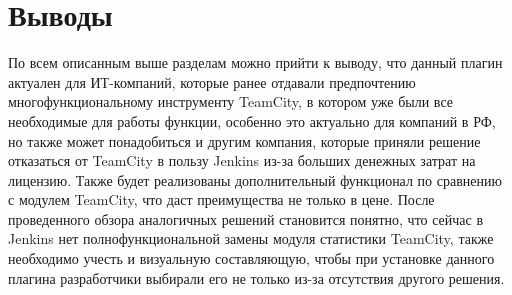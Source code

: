 \section{Выводы} \label{ch1:sec7}

По всем описанным выше разделам можно прийти к выводу, что данный плагин актуален для ИТ-компаний, которые ранее отдавали предпочтению многофункциональному инструменту TeamCity, в котором уже были все необходимые для работы функции, особенно это актуально для компаний в РФ, но также может понадобиться и другим компания, которые приняли решение отказаться от TeamCity в пользу Jenkins из-за больших денежных затрат на лицензию. Также будет реализованы дополнительный функционал по сравнению с модулем TeamCity, что даст преимущества не только в цене. После проведенного обзора аналогичных решений становится понятно, что сейчас в Jenkins нет полнофункциональной замены модуля статистики TeamCity, также необходимо учесть и визуальную составляющую, чтобы при установке данного плагина разработчики выбирали его не только из-за отсутствия другого решения.













%
%

%
%






